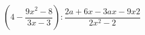 \begin{ex}[type=expression]
	\begin{condition}
		\( \left( 4-\dfrac{9x^2-8}{3x-3} \right):\dfrac{2a+6x-3ax-9x2}{2x^2-2} \)
	\end{condition}
\end{ex}